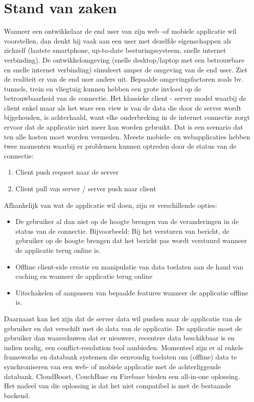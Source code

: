 \section{Stand van zaken}
\label{sec:stand-van-zaken}
Wanneer een ontwikkelaar de end user van zijn web -of mobiele applicatie wil voorstellen, dan denkt hij vaak aan een user met dezelfde eigenschappen als zichzelf (laatste smartphone, up-to-date besturingssysteem,  snelle internet verbinding). De ontwikkelomgeving (snelle desktop/laptop met een betrouwbare en snelle internet verbinding) simuleert amper de omgeving van de end user. Ziet de realiteit er van de end user anders uit. Bepaalde omgevingsfactoren zoals bv. tunnels, trein en vliegtuig kunnen hebben een grote invloed op de betrouwbaarheid van de connectie. Het klassieke client - server model waarbij de client enkel maar als het ware een view is van de data die door de server wordt bijgehouden, is achterhaald, want elke onderbreking in de internet connectie zorgt ervoor dat de applicatie niet meer kan worden gebruikt. Dat is een scenario dat ten alle kosten moet worden vermeden. Meeste mobiele- en webapplicaties hebben twee momenten waarbij er problemen kunnen optreden door de status van de connectie:
\begin{enumerate}  
\item Client push request naar de server
\item Client pull van server / server push naar client
\end{enumerate}
Afhankelijk van wat de applicatie wil doen, zijn er verschillende opties:
\begin{itemize}  
\item De gebruiker al dan niet op de hoogte brengen van de veranderingen in de status van de connectie. Bijvoorbeeld: Bij het versturen van bericht, de gebruiker op de hoogte brengen dat het bericht pas wordt verstuurd wanneer de applicatie terug online is.
\item Offline client-side creatie en manipulatie van data toelaten aan de hand van caching en wanneer de applicatie terug online 
\item Uitschakelen of aanpassen van bepaalde features wanneer de applicatie offline is.
\end{itemize}
Daarnaast kan het zijn dat de server data wil pushen naar de applicatie van de gebruiker en dat verschilt met de data van de applicatie. De applicatie moet de gebruiker dan waarschuwen dat er nieuwere, recentere data beschikbaar is en indien nodig, een conflict-resolution tool aanbieden.
Momenteel zijn er al enkele frameworks en databank systemen die eenvoudig toelaten om (offline) data te synchroniseren van een web- of mobiele applicatie met de achterliggende databank. CloudBoost, CouchBase en Firebase bieden een all-in-one oplossing. Het nadeel van die oplossing is dat het niet compatibel is met de bestaande backend.
